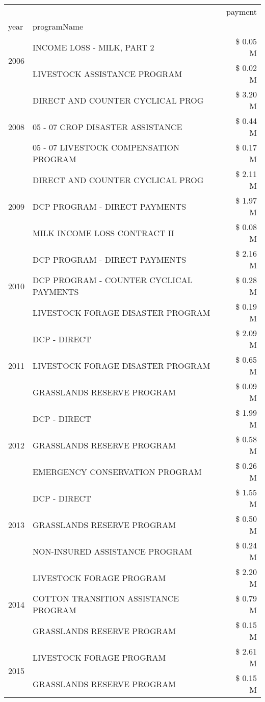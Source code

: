\begin{tabular}{llr}
\toprule
 &  & payment \\
year & programName &  \\
\midrule
\multirow[t]{2}{*}{2006} & INCOME LOSS - MILK, PART 2 & \$ 0.05 M \\
 & LIVESTOCK ASSISTANCE PROGRAM & \$ 0.02 M \\
\cline{1-3}
\multirow[t]{3}{*}{2008} & DIRECT AND COUNTER CYCLICAL PROG & \$ 3.20 M \\
 & 05 - 07 CROP DISASTER ASSISTANCE & \$ 0.44 M \\
 & 05 - 07 LIVESTOCK COMPENSATION PROGRAM & \$ 0.17 M \\
\cline{1-3}
\multirow[t]{3}{*}{2009} & DIRECT AND COUNTER CYCLICAL PROG & \$ 2.11 M \\
 & DCP PROGRAM - DIRECT PAYMENTS & \$ 1.97 M \\
 & MILK INCOME LOSS CONTRACT II & \$ 0.08 M \\
\cline{1-3}
\multirow[t]{3}{*}{2010} & DCP PROGRAM - DIRECT PAYMENTS & \$ 2.16 M \\
 & DCP PROGRAM - COUNTER CYCLICAL PAYMENTS & \$ 0.28 M \\
 & LIVESTOCK FORAGE DISASTER  PROGRAM & \$ 0.19 M \\
\cline{1-3}
\multirow[t]{3}{*}{2011} & DCP - DIRECT & \$ 2.09 M \\
 & LIVESTOCK FORAGE DISASTER PROGRAM & \$ 0.65 M \\
 & GRASSLANDS RESERVE PROGRAM & \$ 0.09 M \\
\cline{1-3}
\multirow[t]{3}{*}{2012} & DCP - DIRECT & \$ 1.99 M \\
 & GRASSLANDS RESERVE PROGRAM & \$ 0.58 M \\
 & EMERGENCY CONSERVATION PROGRAM & \$ 0.26 M \\
\cline{1-3}
\multirow[t]{3}{*}{2013} & DCP - DIRECT & \$ 1.55 M \\
 & GRASSLANDS RESERVE PROGRAM & \$ 0.50 M \\
 & NON-INSURED ASSISTANCE PROGRAM & \$ 0.24 M \\
\cline{1-3}
\multirow[t]{3}{*}{2014} & LIVESTOCK FORAGE PROGRAM & \$ 2.20 M \\
 & COTTON TRANSITION ASSISTANCE PROGRAM & \$ 0.79 M \\
 & GRASSLANDS RESERVE PROGRAM & \$ 0.15 M \\
\cline{1-3}
\multirow[t]{3}{*}{2015} & LIVESTOCK FORAGE PROGRAM & \$ 2.61 M \\
 & GRASSLANDS RESERVE PROGRAM & \$ 0.15 M \\

\end{tabular}

